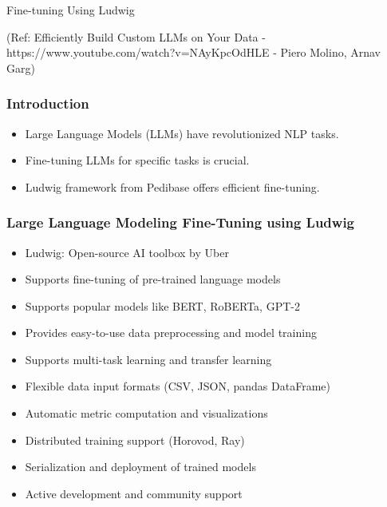 \begin{frame}[fragile]\frametitle{}
\begin{center}
{\Large Fine-tuning Using Ludwig}

{\tiny (Ref: Efficiently Build Custom LLMs on Your Data - https://www.youtube.com/watch?v=NAyKpcOdHLE - Piero Molino,  Arnav Garg)}

\end{center}
\end{frame}

\begin{frame}[fragile]\frametitle{Introduction}
    \begin{itemize}
        \item Large Language Models (LLMs) have revolutionized NLP tasks.
        \item Fine-tuning LLMs for specific tasks is crucial.
        \item Ludwig framework from Pedibase offers efficient fine-tuning.
    \end{itemize}
\end{frame}


\begin{frame}[fragile]\frametitle{Large Language Modeling Fine-Tuning using Ludwig}
\begin{itemize}
    \item Ludwig: Open-source AI toolbox by Uber
    \item Supports fine-tuning of pre-trained language models
    \item Supports popular models like BERT, RoBERTa, GPT-2
    \item Provides easy-to-use data preprocessing and model training
    \item Supports multi-task learning and transfer learning
    \item Flexible data input formats (CSV, JSON, pandas DataFrame)
    \item Automatic metric computation and visualizations
    \item Distributed training support (Horovod, Ray)
    \item Serialization and deployment of trained models
    \item Active development and community support
\end{itemize}
\end{frame}


